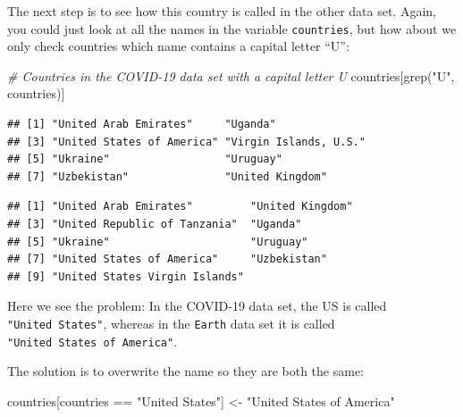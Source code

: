 \documentclass[
]{book}
\newenvironment{Shaded}{\begin{snugshade}}{\end{snugshade}}
\newcommand{\CommentTok}[1]{\textcolor[rgb]{0.56,0.35,0.01}{\textit{#1}}}
\newcommand{\FunctionTok}[1]{\textcolor[rgb]{0.00,0.00,0.00}{#1}}
\newcommand{\NormalTok}[1]{#1}
\newcommand{\OtherTok}[1]{\textcolor[rgb]{0.56,0.35,0.01}{#1}}
\newcommand{\SpecialCharTok}[1]{\textcolor[rgb]{0.00,0.00,0.00}{#1}}
\newcommand{\StringTok}[1]{\textcolor[rgb]{0.31,0.60,0.02}{#1}}
\begin{document}
The next step is to see how this country is called in the other data set. Again, you could just look at all the names in the variable \texttt{countries}, but how about we only check countries which name contains a capital letter ``U'':

\begin{Shaded}
\begin{Highlighting}[]
\CommentTok{\# Countries in the COVID{-}19 data set with a capital letter U}
\NormalTok{countries[}\FunctionTok{grep}\NormalTok{(}\StringTok{"U"}\NormalTok{, countries)]}
\end{Highlighting}
\end{Shaded}

\begin{verbatim}
## [1] "United Arab Emirates"     "Uganda"                  
## [3] "United States of America" "Virgin Islands, U.S."    
## [5] "Ukraine"                  "Uruguay"                 
## [7] "Uzbekistan"               "United Kingdom"
\end{verbatim}

\begin{Shaded}
\end{Shaded}

\begin{verbatim}
## [1] "United Arab Emirates"         "United Kingdom"              
## [3] "United Republic of Tanzania"  "Uganda"                      
## [5] "Ukraine"                      "Uruguay"                     
## [7] "United States of America"     "Uzbekistan"                  
## [9] "United States Virgin Islands"
\end{verbatim}

Here we see the problem: In the COVID-19 data set, the US is called \texttt{"United\ States"}, whereas in the \texttt{Earth} data set it is called \texttt{"United\ States\ of\ America"}.

The solution is to overwrite the name so they are both the same:

\begin{Shaded}
\begin{Highlighting}[]
\NormalTok{countries[countries }\SpecialCharTok{==} \StringTok{"United States"}\NormalTok{] }\OtherTok{\textless{}{-}} \StringTok{"United States of America"}
\end{Highlighting}
\end{Shaded}
\end{document}
